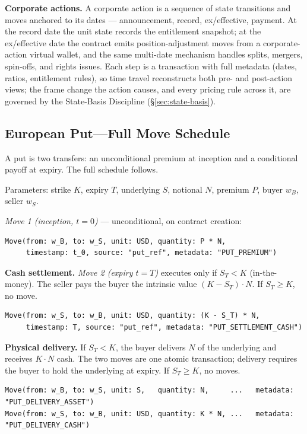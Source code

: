 \noindent\textbf{Corporate actions.} A corporate action is a sequence of state transitions and moves anchored to its dates --- announcement, record, ex/effective, payment. At the record date the unit state records the entitlement snapshot; at the ex/effective date the contract emits position-adjustment moves from a corporate-action virtual wallet, and the same multi-date mechanism handles splits, mergers, spin-offs, and rights issues. Each step is a transaction with full metadata (dates, ratios, entitlement rules), so time travel reconstructs both pre- and post-action views; the frame change the action causes, and every pricing rule across it, are governed by the State-Basis Discipline (\S\ref{sec:state-basis}).

\subsection{European Put---Full Move Schedule}

A put is two transfers: an unconditional premium at inception and a conditional payoff at expiry. The full schedule follows.

\noindent Parameters: strike $K$, expiry $T$, underlying $S$, notional $N$, premium $P$, buyer $w_B$, seller $w_S$.

\noindent\textit{Move 1 (inception, $t=0$)} --- unconditional, on contract creation:

\begin{lstlisting}
Move(from: w_B, to: w_S, unit: USD, quantity: P * N,
     timestamp: t_0, source: "put_ref", metadata: "PUT_PREMIUM")
\end{lstlisting}

\noindent\textbf{Cash settlement.} \textit{Move 2 (expiry $t=T$)} executes only if $S_T < K$ (in-the-money). The seller pays the buyer the intrinsic value $(K-S_T)\cdot N$. If $S_T \ge K$, no move.

\begin{lstlisting}
Move(from: w_S, to: w_B, unit: USD, quantity: (K - S_T) * N,
     timestamp: T, source: "put_ref", metadata: "PUT_SETTLEMENT_CASH")
\end{lstlisting}

\noindent\textbf{Physical delivery.} If $S_T < K$, the buyer delivers $N$ of the underlying and receives $K\cdot N$ cash. The two moves are one atomic transaction; delivery requires the buyer to hold the underlying at expiry. If $S_T \ge K$, no moves.

\begin{lstlisting}
Move(from: w_B, to: w_S, unit: S,   quantity: N,     ...   metadata: "PUT_DELIVERY_ASSET")
Move(from: w_S, to: w_B, unit: USD, quantity: K * N, ...   metadata: "PUT_DELIVERY_CASH")
\end{lstlisting}

